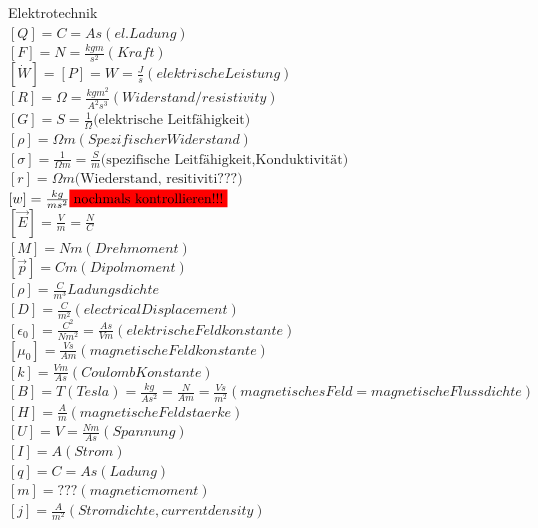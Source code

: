 \documentclass[a4paper]{scrartcl}
\begin{document}
Elektrotechnik\\
$ [Q]=C=As (el. Ladung)$\\
$ [F]=N=\frac{kg m}{s^2} (Kraft)$\\
$ [\dot W]=[P]=W=\frac{J}{s} (elektrische Leistung)$\\
$ [R] = \Omega = \frac{kg m^2}{A^2 s^3} (Widerstand/resistivity) $\\
$ [G] = S = \frac{1}{\Omega} \text{(elektrische Leitfähigkeit)}$\\
$ [\rho] = \Omega m (Spezifischer Widerstand)$\\
$ [\sigma] = \frac{1}{\Omega m} = \frac{S}{m} \text{(spezifische Leitfähigkeit,Konduktivität)} $\\
$ [r] = \Omega m \text{(Wiederstand, resitiviti???)} $\\
$ [w]=\frac{kg}{ms^2} \colorbox{red}{nochmals kontrollieren!!!} $\\
$ [\vec E]=\frac{V}{m} = \frac{N}{C}$\\
$ [M]=Nm (Drehmoment)$\\
$ [\vec p]=Cm (Dipolmoment)$\\
$ [\rho]=\frac{C}{m^3} Ladungsdichte$\\
$ [D]=\frac{C}{m^2} (electrical Displacement)$\\
$ [\epsilon_0]= \frac{C^2}{Nm^2}=\frac{As}{Vm} (elektrische Feldkonstante)$\\
$ [\mu_0] = \frac{Vs}{Am} (magnetische Feldkonstante)$\\
$ [k] = \frac{Vm}{As} (Coulomb Konstante)$\\
$ [B]= T (Tesla) = \frac{kg}{As^2} = \frac{N}{Am} = \frac{Vs}{m^2} (magnetisches
Feld = magnetische Flussdichte)$\\
$ [H]= \frac{A}{m} (magnetische Feldstaerke)$\\
$ [U]= V = \frac{Nm}{As} (Spannung) $\\
$ [I]= A (Strom) $\\
$ [q]= C = As (Ladung)$\\
$ [m]= ??? (magnetic moment)$\\
$ [j]= \frac{A}{m^2} (Stromdichte, current density)$\\
\end{document}
